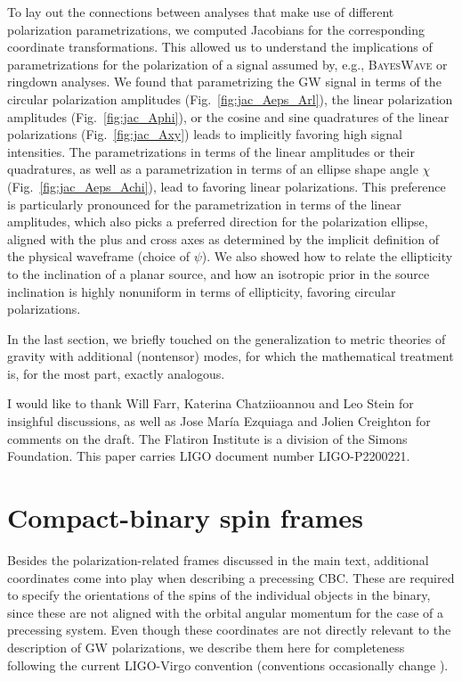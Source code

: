 \documentclass[aps,prd,twocolumn,superscriptaddress,preprintnumbers,floatfix,nofootinbib]{revtex4-2}
\newcommand{\dcc}{LIGO-P2200221}
\begin{document}
To lay out the connections between analyses that make use of different polarization parametrizations, we computed Jacobians for the corresponding coordinate transformations.
This allowed us to understand the implications of parametrizations for the polarization of a signal assumed by, e.g., \textsc{BayesWave} or ringdown analyses.
We found that parametrizing the GW signal in terms of the circular polarization amplitudes (Fig.~\ref{fig:jac_Aeps_Arl}), the linear polarization amplitudes (Fig.~\ref{fig:jac_Aphi}), or the cosine and sine quadratures of the linear polarizations (Fig.~\ref{fig:jac_Axy}) leads to implicitly favoring high signal intensities.
The parametrizations in terms of the linear amplitudes or their quadratures, as well as a parametrization in terms of an ellipse shape angle $\chi$ (Fig.~\ref{fig:jac_Aeps_Achi}), lead to favoring linear polarizations.
This preference is particularly pronounced for the parametrization in terms of the linear amplitudes, which also picks a preferred direction for the polarization ellipse, aligned with the plus and cross axes as determined by the implicit definition of the physical waveframe (choice of $\psi$).
We also showed how to relate the ellipticity to the inclination of a planar source, and how an isotropic prior in the source inclination is highly nonuniform in terms of ellipticity, favoring circular polarizations.

In the last section, we briefly touched on the generalization to metric theories of gravity with additional (nontensor) modes, for which the mathematical treatment is, for the most part, exactly analogous.

\begin{acknowledgments}
I would like to thank Will Farr, Katerina Chatziioannou and Leo Stein for insighful discussions, as well as Jose Mar\'ia Ezquiaga and Jolien Creighton for comments on the draft.
The Flatiron Institute is a division of the Simons Foundation.
This paper carries LIGO document number \dcc{}.
\end{acknowledgments}

\appendix

\section{Compact-binary spin frames}
\label{app:spins}

Besides the polarization-related frames discussed in the main text, additional coordinates come into play when describing a precessing \ac{CBC}.
These are required to specify the orientations of the spins of the individual objects in the binary, since these are not aligned with the orbital angular momentum for the case of a precessing system.
Even though these coordinates are not directly relevant to the description of GW polarizations, we describe them here for completeness following the current LIGO-Virgo convention \cite{LALSuite:spins} (conventions occasionally change \cite{Pfeiffer:T1800226}).
\end{document}
